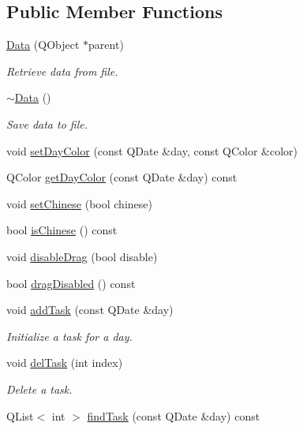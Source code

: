 \subsection*{Public Member Functions}
\begin{DoxyCompactItemize}
\item 
\hyperlink{classData_aaa7fad49e389b8fc445a6af43629609f}{Data} (Q\+Object $\ast$parent)
\begin{DoxyCompactList}\small\item\em Retrieve data from file. \end{DoxyCompactList}\item 
\hyperlink{classData_aab31956423290f0d62dcca47ab4d16dd}{$\sim$\+Data} ()
\begin{DoxyCompactList}\small\item\em Save data to file. \end{DoxyCompactList}\item 
void \hyperlink{classData_add1cb88caf02345f55126fd9ca934c3e}{set\+Day\+Color} (const Q\+Date \&day, const Q\+Color \&color)
\item 
Q\+Color \hyperlink{classData_a46470cbe33c14e9f24c8427e257a311e}{get\+Day\+Color} (const Q\+Date \&day) const 
\item 
void \hyperlink{classData_a051034d0bb71172fc8bbb3b395d2fe33}{set\+Chinese} (bool chinese)
\item 
bool \hyperlink{classData_ae538200aa5edaec5d01ee80bcda3f042}{is\+Chinese} () const 
\item 
void \hyperlink{classData_a8ece00071d9093892b80f1c994f99fb5}{disable\+Drag} (bool disable)
\item 
bool \hyperlink{classData_a5acaf7bb5f48c325240035351fe6b9bc}{drag\+Disabled} () const 
\item 
void \hyperlink{classData_a1a124e38871f90a177ddc34841c8e919}{add\+Task} (const Q\+Date \&day)
\begin{DoxyCompactList}\small\item\em Initialize a task for a day. \end{DoxyCompactList}\item 
void \hyperlink{classData_a16e96a143863d25e3dbcd875199e17f2}{del\+Task} (int index)
\begin{DoxyCompactList}\small\item\em Delete a task. \end{DoxyCompactList}\item 
Q\+List$<$ int $>$ \hyperlink{classData_aaf5830615d5abadbcb79f34dd89d4e0b}{find\+Task} (const Q\+Date \&day) const 

\end{DoxyCompactItemize}

